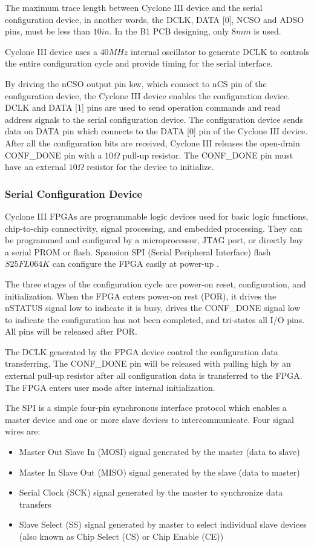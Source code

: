 The maximum trace length between Cyclone III device and the serial configuration device, in another words, the DCLK, DATA [0], NCSO and ADSO pins, must be less than $10in$. In the B1 PCB designing, only $8mm$ is used.

Cyclone III device uses a $40MHz$ internal oscillator to generate DCLK to controls the entire configuration cycle and provide timing for the serial interface.

By driving the nCSO output pin low, which connect to nCS pin of the configuration device, the Cyclone III device enables the configuration device.  DCLK and DATA [1] pins are used to send operation commands and read address signals to the serial configuration device. The configuration device sends data on DATA pin which connects to the DATA [0] pin of the Cyclone III device. After all the configuration bits are received, Cyclone III releases the open-drain CONF\_DONE pin with a $10\Omega$ pull-up resistor. The CONF\_DONE pin must have an external $10\Omega$ resistor for the device to initialize.


\subsubsection{Serial Configuration Device}

Cyclone III FPGAs are programmable logic devices used for basic logic functions, chip-to-chip connectivity, signal processing, and embedded processing. They can be programmed and configured by a microprocessor, JTAG port, or directly bay a serial PROM or flash. Spansion SPI (Serial Peripheral Interface) flash $S25FL064K$ can configure the FPGA easily at power-up \citep{Spansion:2011:appnote}.

The three stages of the configuration cycle are power-on reset, configuration, and initialization. When the FPGA enters power-on rest (POR), it drives the nSTATUS signal low to indicate it is busy, drives the CONF\_DONE signal low to indicate the configuration has not been completed, and tri-states all I/O pins. All pins will be released after POR.

The DCLK generated by the FPGA device control the configuration data transferring. The CONF\_DONE pin will be released with pulling high by an external pull-up resistor after all configuration data is transferred to the FPGA. The FPGA enters user mode after internal initialization.

The SPI is a simple four-pin synchronous interface protocol which enables a master device and one or more slave devices to intercommunicate. Four signal wires are:
\begin{itemize}
 \item Master Out Slave In (MOSI) signal generated by the master (data to slave)
 \item Master In Slave Out (MISO) signal generated by the slave (data to master)
 \item Serial Clock (SCK) signal generated by the master to synchronize data transfers
 \item Slave Select (SS) signal generated by master to select individual slave devices (also known as Chip Select (CS) or Chip Enable (CE))
\end{itemize}


